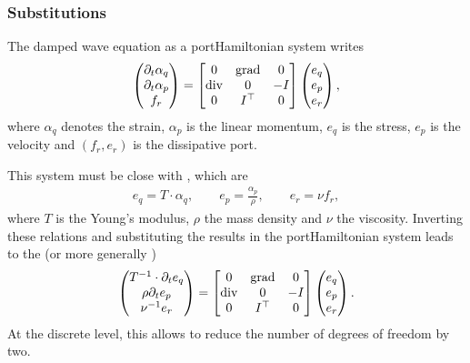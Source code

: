 \documentclass[letterpaper,10pt,english]{sphinxmanual}
\begin{document}
\subsubsection{Substitutions}
\label{\detokenize{examples/wave_coenergy:substitutions}}
\sphinxAtStartPar
The damped wave equation as a port\sphinxhyphen{}Hamiltonian system writes
\begin{equation*}
\begin{split}\begin{pmatrix} \partial_t \alpha_q \\ \partial_t \alpha_p \\ f_r \end{pmatrix}
=
\begin{bmatrix} 0 & {\rm grad} & 0 \\ {\rm div} & 0 & -I \\ 0 & I^\top & 0 \end{bmatrix}
\begin{pmatrix} e_q \\ e_p \\ e_r \end{pmatrix},\end{split}
\end{equation*}
\sphinxAtStartPar
where \(\alpha_q\) denotes the strain, \(\alpha_p\) is the
linear momentum, \(e_q\) is the stress, \(e_p\) is the velocity
and \((f_r,e_r)\) is the dissipative port.

\sphinxAtStartPar
This system must be close with , which are
\begin{equation*}
\begin{split}e_q = T \cdot \alpha_q, \qquad e_p = \frac{\alpha_p}{\rho}, \qquad e_r = \nu f_r,\end{split}
\end{equation*}
\sphinxAtStartPar
where \(T\) is the Young’s modulus, \(\rho\) the mass density
and \(\nu\) the viscosity. Inverting these relations and
substituting the results in the port\sphinxhyphen{}Hamiltonian system leads to the
 (or more generally )
\begin{equation*}
\begin{split}\begin{pmatrix} T^{-1} \cdot \partial_t e_q \\ \rho \partial_t e_p \\ \nu^{-1} e_r \end{pmatrix}
=
\begin{bmatrix} 0 & {\rm grad} & 0 \\ {\rm div} & 0 & -I \\ 0 & I^\top & 0 \end{bmatrix}
\begin{pmatrix} e_q \\ e_p \\ e_r \end{pmatrix}.\end{split}
\end{equation*}
\sphinxAtStartPar
At the discrete level, this allows to reduce the number of degrees of
freedom by two.
\end{document}
